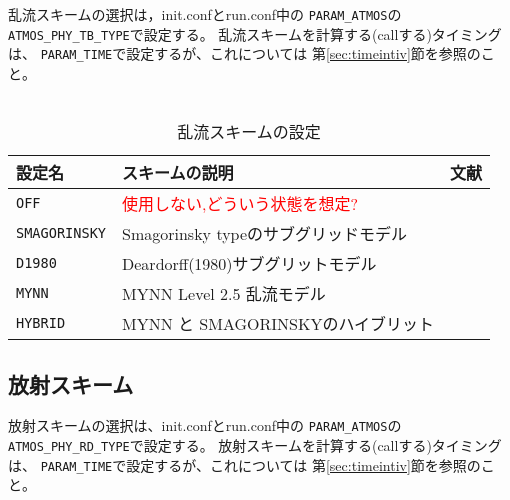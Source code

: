 乱流スキームの選択は，init.confとrun.conf中の
\verb|PARAM_ATMOS|の\verb|ATMOS_PHY_TB_TYPE|で設定する。
乱流スキームを計算する(callする)タイミングは、
\verb|PARAM_TIME|で設定するが、これについては
第\ref{sec:timeintiv}節を参照のこと。\\

\\

\begin{table}[h]
\begin{center}
  \caption{乱流スキームの設定}
  \label{tab:nml_atm_tb}
  \begin{tabularx}{150mm}{lXX} \hline
    \rowcolor[gray]{0.9}  設定名 & スキームの説明 & 文献\\ \hline
      \verb|OFF|          & \textcolor{red}{使用しない,どういう状態を想定?} &  \\
      \verb|SMAGORINSKY|  & Smagorinsky typeのサブグリッドモデル    & \citet{smagorinsky_1963,lilly_1962,Brown_etal_1994,Scotti_1993} \\
      \verb|D1980|        & Deardorff(1980)サブグリットモデル &\citet{Deardorff_1980} \\
      \verb|MYNN|         & MYNN Level 2.5 乱流モデル & \citet{my_1982,nakanishi_2004} \\
      \verb|HYBRID|       & MYNN と SMAGORINSKYのハイブリット &  \\
    \hline
  \end{tabularx}
\end{center}
\end{table}




\subsection{放射スキーム} \label{sec:basic_radiation}
放射スキームの選択は、init.confとrun.conf中の
\verb|PARAM_ATMOS|の\verb|ATMOS_PHY_RD_TYPE|で設定する。
放射スキームを計算する(callする)タイミングは、
\verb|PARAM_TIME|で設定するが、これについては
第\ref{sec:timeintiv}節を参照のこと。\\

